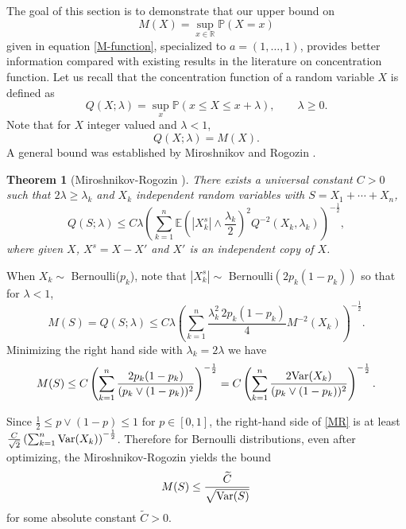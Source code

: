 \documentclass[11pt]{article}
\newtheorem{thm}{Theorem}[section]
\DeclareMathOperator{\Var}{Var}
\newcommand{\1}{[1]}
\newcommand{\Prob}{\mathbb{P}}
\def\Var{{\rm Var}}
\begin{document}
The goal of this section is to demonstrate that our upper bound on
$$ M(X) = \sup_{x \in \mathbb{R}} \mathbb{P}(X = x) $$
given in equation \eqref{M-function}, specialized to $a=(1, \dots, 1)$, provides better information compared with existing results in the literature on concentration function. Let us recall that the concentration function of a random variable $X$ is defined as
$$ Q(X ; \lambda) = \sup_x \Prob(x \leq X \leq x + \lambda), \qquad \lambda \geq 0. $$
Note that for $X$ integer valued and $\lambda < 1$,
\[
    Q(X; \lambda) = M(X).
\]
A general bound was established by Miroshnikov and Rogozin \cite{M-R}.


\begin{thm}[Miroshnikov-Rogozin \cite{M-R}]
    There exists a universal constant $C > 0$ such that $2 \lambda \geq \lambda_k$ and $X_k$ independent random variables with $S = X_1 + \cdots + X_n$,
    \[
        Q(S; \lambda) \leq C \lambda \left( \sum_{k=1}^n \mathbb{E}\left( |X_k^s| \wedge \frac{\lambda_k}{2} \right)^2 Q^{-2}(X_k, \lambda_k) \right)^{-\frac 1 2},
    \]
    where given $X$, $X^s = X - X'$ and $X'$ is an independent copy of $X$.
\end{thm}

When $X_k \sim$ Bernoulli($p_k$), note that $|X_k^s| \sim$ Bernoulli$(2p_k(1-p_k))$ so that for $\lambda < 1$,
\[
    M(S) = Q(S;\lambda) \leq C \lambda \left( \sum_{k=1}^n  \frac{\lambda_k^2 \,2 p_k(1-p_k) }{4}  M^{-2}(X_k) \right)^{-\frac 1 2}.
\]
Minimizing the right hand side with $\lambda_k = 2 \lambda$ we have
\begin{equation}\label{MR}
    M(S) \leq C \left( \sum_{k=1}^n \frac{2 p_k (1-p_k)}{(p_k \vee (1-p_k))^2}\right)^{- \frac 1 2} = C \left( \sum_{k=1}^n \frac{ 2 \Var(X_k)}{(p_k \vee (1-p_k))^2} \right)^{- \frac 1 2}.
\end{equation}

Since $\frac 1 2 \leq p \vee (1-p) \leq 1$ for $p \in [0,1]$, the right-hand side of \eqref{MR} is at least $\frac{C}{\sqrt{2}} \left( \sum_{k=1}^n \Var(X_k) \right)^{-\frac 1 2}$. Therefore for Bernoulli distributions, even after optimizing, the Miroshnikov-Rogozin yields the bound
$$ M(S) \leq \frac{\widetilde{C}}{\sqrt{\Var(S)}} $$
for some absolute constant $\widetilde{C} > 0$. 
\end{document}
